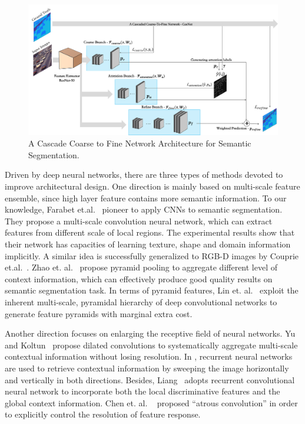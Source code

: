 \documentclass[10.5pt,compsoc]{TsT}
\newcommand{\upcite}[1]{\superscript{\textsuperscript{\cite{#1}}}}
\theoremstyle{mystyle}
\newcommand{\upcite}[1]{\textsuperscript{\cite{#1}}}
\begin{document}
{\begin{figure}[!ht]
\centering
\includegraphics[width=1.9\columnwidth]{fig2.png}
\caption{A Cascade Coarse to Fine Network Architecture for Semantic Segmentation.}
\label{fig2}
\end{figure} 

Driven by deep neural networks, there are three types of methods devoted to improve architectural design. One direction is mainly based on multi-scale feature ensemble, since high layer feature contains more semantic information. To our knowledge,  Farabet et.al.~\upcite{11}  pioneer to apply CNNs to semantic segmentation. They propose a multi-scale convolution neural network, which can extract features from different scale of local regions. The experimental results show that their network has capacities of learning texture, shape and domain information implicitly. A similar idea is successfully generalized to RGB-D images by Couprie et.al.~\upcite{12}. Zhao et. al.~\upcite{21} propose pyramid pooling to aggregate different level of context information, which can effectively produce good quality results on semantic segmentation task. In terms of pyramid features,  Lin et. al.~\upcite{36}  exploit the inherent multi-scale, pyramidal hierarchy of deep convolutional networks to generate feature pyramids with marginal extra cost.

Another direction focuses on enlarging the receptive field of neural networks. Yu and Koltun~\upcite{29} propose dilated convolutions to systematically aggregate multi-scale contextual information without losing resolution. In \cite{30}, recurrent neural networks are used to retrieve contextual information by sweeping the image horizontally and vertically in both directions. Besides, Liang~\upcite{24} adopts recurrent convolutional neural network to incorporate both the local discriminative features and the global context information. Chen et. al. ~\cite{35} proposed ``atrous convolution'' in order to explicitly control the resolution of feature response.

}
\end{document}
